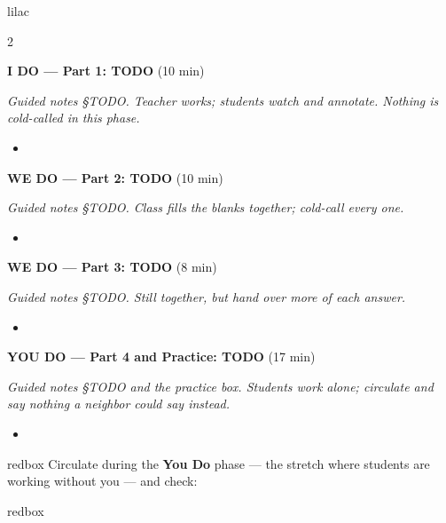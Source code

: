 \documentclass[10pt]{article}
\begin{document}
\begin{skillbox}{lilac}
\begin{multicols}{2}

\textbf{I DO --- Part 1: TODO} (10 min)

\textit{Guided notes \S TODO. Teacher works; students watch and annotate. Nothing
is cold-called in this phase.}
\begin{itemize}
  \item %
\end{itemize}

\textbf{WE DO --- Part 2: TODO} (10 min)

\textit{Guided notes \S TODO. Class fills the blanks together; cold-call every one.}
\begin{itemize}
  \item %
\end{itemize}

\columnbreak

\textbf{WE DO --- Part 3: TODO} (8 min)

\textit{Guided notes \S TODO. Still together, but hand over more of each answer.}
\begin{itemize}
  \item %
\end{itemize}

\textbf{YOU DO --- Part 4 and Practice: TODO} (17 min)

\textit{Guided notes \S TODO and the practice box. Students work alone; circulate
and say nothing a neighbor could say instead.}
\begin{itemize}
  \item %
\end{itemize}
\end{multicols}
\end{skillbox}

\begin{skillbox}{redbox}
Circulate during the \textbf{You Do} phase --- the stretch where students are
working without you --- and check:
\end{skillbox}

\begin{skillbox}{redbox}
\end{skillbox}
\end{document}
